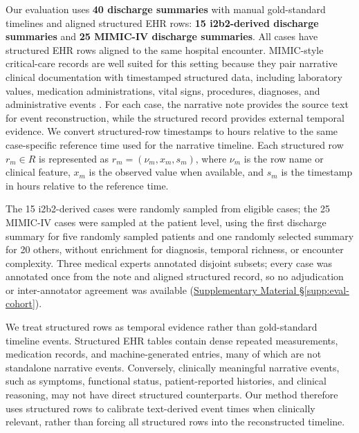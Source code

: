\documentclass{ws-procs11x85}
\newif\ifshowrebuttalcolor
\newcommand{\rebuttal}[1]{%
  \ifshowrebuttalcolor
    \textcolor{rebuttalblue}{#1}%
  \else
    #1%
  \fi
}
\begin{document}
Our evaluation uses \textbf{40 discharge summaries} with manual gold-standard timelines and aligned structured EHR rows: \textbf{15 i2b2-derived discharge summaries} and \textbf{25 MIMIC-IV discharge summaries}. All cases have structured EHR rows aligned to the same hospital encounter. MIMIC-style critical-care records are well suited for this setting because they pair narrative clinical documentation with timestamped structured data, including laboratory values, medication administrations, vital signs, procedures, diagnoses, and administrative events \cite{johnson2016mimic,johnson2023mimic}. For each case, the narrative note provides the source text for event reconstruction, while the structured record provides external temporal evidence. We convert structured-row timestamps to hours relative to the same case-specific reference time used for the narrative timeline. Each structured row $r_m \in R$ is represented as $r_m=(\nu_m,x_m,s_m)$, where $\nu_m$ is the row name or clinical feature, $x_m$ is the observed value when available, and $s_m$ is the timestamp in hours relative to the reference time.

\rebuttal{The 15 i2b2-derived cases were randomly sampled from eligible cases; the 25 MIMIC-IV cases were sampled at the patient level, using the first discharge summary for five randomly sampled patients and one randomly selected summary for 20 others, without enrichment for diagnosis, temporal richness, or encounter complexity. Three medical experts annotated disjoint subsets; every case was annotated once from the note and aligned structured record, so no adjudication or inter-annotator agreement was available (\hyperref[supp:eval-cohort]{Supplementary Material \S\ref*{supp:eval-cohort}}).}

We treat structured rows as temporal evidence rather than gold-standard timeline events. Structured EHR tables contain dense repeated measurements, medication records, and machine-generated entries, many of which are not standalone narrative events. Conversely, clinically meaningful narrative events, such as symptoms, functional status, patient-reported histories, and clinical reasoning, may not have direct structured counterparts. Our method therefore uses structured rows to calibrate text-derived event times when clinically relevant, rather than forcing all structured rows into the reconstructed timeline.

\end{document}
